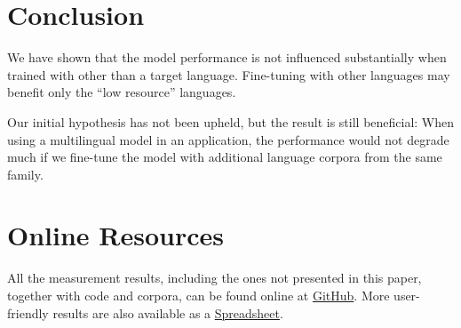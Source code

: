 \documentclass[sigconf]{acmart}
\newcommand{\mpu}[1]{\hl{\textbf{MP:} #1}}
\begin{document}
\section{Conclusion}
\label{sec:conclusion}
We have shown that the model performance is not influenced substantially when trained with other than a target language.
Fine-tuning with other languages may benefit only the ``low resource'' languages.

Our initial hypothesis has not been upheld, but the result is still beneficial:
When using a multilingual model in an application, the performance would not degrade much if we fine-tune the model with additional language corpora from the same family.






\appendix

\section{Online Resources}
\label{sec:online-resources}

All the measurement results, including the ones not presented in this paper, together with code and corpora, can be found online at
{\color{blue}\href{https://github.com/ivlcic/trans-ner}{GitHub}}.
More user-friendly results are also available as a
{\color{blue}\href{https://docs.google.com/spreadsheets/d/16UaPR-qneNN8mlzjNkjc9kdry2eQl4J84t3EfDOtBj0/edit?usp=sharing}{Spreadsheet}}.
\end{document}
